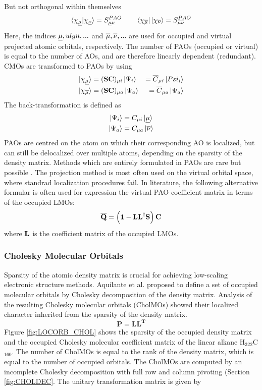 \noindent But not orthogonal within themselves
\begin{equation}
\sbraket{\chi_{\ulgm}}{\chi_{\ulgn}} = S^{PAO}_{\ulgm\ulgn} \qquad \bra{\chi_{\olgm}} \sket{\chi_{\olgn}} = S^{PAO}_{\olgm\olgn}
\end{equation}
\noindent Here, the indices $\underline{\mu},ulgn,...$ and $\overline{\mu},\overline{\nu},...$ are used for occupied and virtual projected atomic orbitals, respectively. The number of PAOs (occupied or virtual) is equal to the number of AOs, and are therefore linearly dependent (redundant). CMOs are transformed to PAOs by using
\begin{eqnarray}
\ket{\smash{\chi_{\underline{\mu}}}} &= (\mathbf{SC})_{\mu i}  \ket{\smash{\Psi_i}} &= \overline{C}_{\mu i} \ket{Psi_i} \\
\ket{\smash{\chi_{\overline{\mu}}}} &= (\mathbf{SC})_{\mu a} \ket{\smash{\Psi_a}} &=  \overline{C}_{\mu a} \ket{\Psi_a}
\label{CMO2PAO}
\end{eqnarray}
\noindent The back-transformation is defined as
\begin{eqnarray}
\ket{\smash{\Psi_{i}}} &= C_{\mu i} \ket{\smash{\underline{\mu}}} \\
\ket{\smash{\Psi_{a}}} &= C_{\mu a} \ket{\smash{\overline{\nu}}} 
\label{PAO2CMO}
\end{eqnarray}
PAOs are centred on the atom on which their corresponding AO is localized, but can still be delocalized over multiple atoms, depending on the sparsity of the density matrix. Methods which are entirely formulated in PAOs are rare but possible \cite{Chr2006}. The projection method is most often used on the virtual orbital space, where standrad localization procedures fail. In literature, the following alternative formular is often used for expression the virtual PAO coefficient matrix in terms of the occupied LMOs:
\begin{equation}
\mathbf{\overline{Q}} = \left( \mathbf{1} - \mathbf{LL}^{\dagger} \mathbf{S} \right) \mathbf{C} 
\end{equation}
\noindent where $\mathbf{L}$ is the coefficient matrix of the occupied LMOs.

\subsubsection{Cholesky Molecular Orbitals}

Sparsity of the atomic density matrix is crucial for achieving low-scaling electronic structure methods. Aquilante et al. proposed \cite{Aqu2006} to define a set of occupied molecular orbitals by Cholesky decomposition of the density matrix. Analysis of the resulting Cholesky molecular orbitals (CholMOs) showed their localized character inherited from the sparsity of the density matrix.
\begin{equation}
\mathbf{P} = \mathbf{LL^T}
\end{equation}
Figure \ref{fig:LOCORB_CHOL} shows the sparsity of the occupied density matrix and the occupied Cholesky molecular coefficient matrix of the linear alkane H$_{322}$C$_{160}$. The number of CholMOs is equal to the rank of the density matrix, which is equal to the number of occupied orbitals. The CholMOs are computed by an incomplete Cholesky decomposition with full row and column pivoting (Section \ref{fig:CHOLDEC}. The unitary transformation matrix is given by


